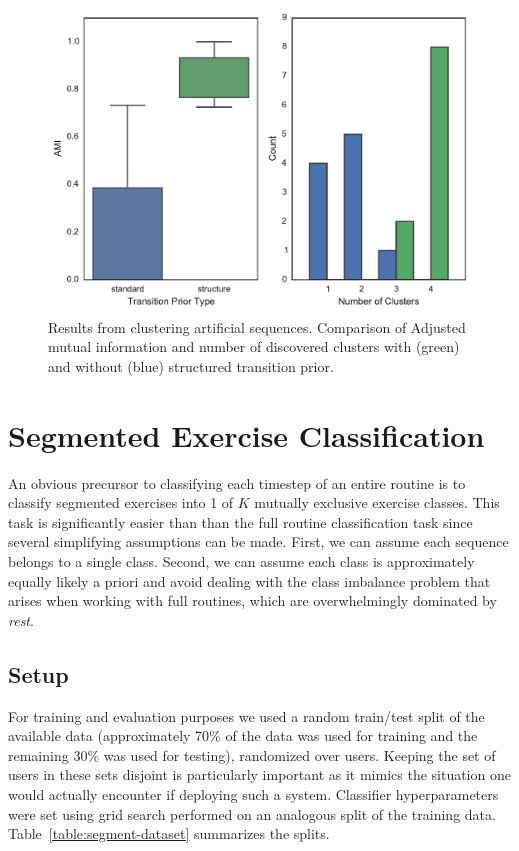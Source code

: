 \documentclass[12pt]{report}
\newcommand{\1}[0]{\mathbbm{1}}
\begin{document}
\begin{figure}[H]
    \centering
    \includegraphics[width=\textwidth]{./img/artificial-cluster-results.pdf}
    \caption[Synthetic sequence clustering results]{
        Results from clustering artificial sequences.
        Comparison of Adjusted mutual information and number of discovered
        clusters with (green) and without (blue) structured transition prior.
    }
    \label{fig:artificial-cluster-metrics}
\end{figure}


\chapter{Segmented Exercise Classification}
\label{chap:Segmented Exercise Classification}
An obvious precursor to classifying each timestep of an entire routine is to classify segmented
exercises into 1 of $K$ mutually exclusive exercise classes. This task is significantly easier than
than the full routine classification task since several simplifying assumptions can be made. First,
we can assume each sequence belongs to a single class. Second, we can assume each class is approximately
equally likely a priori and avoid dealing with the class imbalance problem that arises when working with
full routines, which are overwhelmingly dominated by \emph{rest}.

\section{Setup}
For training and evaluation purposes we used a random train/test split of the
available data (approximately 70\% of the data was used for training and the remaining
30\% was used for testing), randomized over users. Keeping the set of users in these sets
disjoint is particularly important as it mimics the situation one would actually encounter
if deploying such a system. Classifier hyperparameters were set using grid search performed on an
analogous split of the training data. Table~\ref{table:segment-dataset} summarizes the splits.
\end{document}

